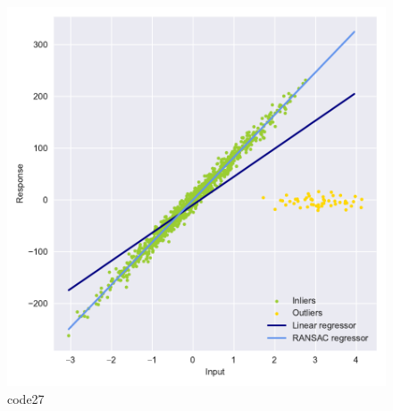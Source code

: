 \begin{PythonCode}\label{例20}
	
\end{PythonCode}

\begin{PythonCode}\label{例21}
	
\end{PythonCode}

\begin{figure}[htbp]
	\centering
	\includegraphics[width=14cm]{codeimage/code27}
	\caption{code27}
	\label{code27}
\end{figure}

\begin{PythonCode}\label{例22}
	
\end{PythonCode}

